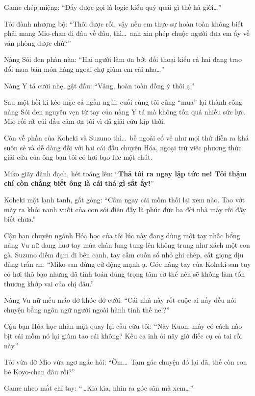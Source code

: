 \documentclass[../main.tex]{subfiles}
\begin{document}
Game chép miệng: ``Đấy được gọi là logic kiểu quỷ quái gì thế hả giời\dots''

Tôi đành nhượng bộ: ``Thôi được rồi, vậy nếu em thực sự hoàn toàn không biết phải mang Mio-chan đi đâu về đâu, thì\dots\ anh xin phép chuộc người đưa em ấy về văn phòng được chứ?''

Nàng Sói đen phàn nàn: ``Hai người làm ơn bớt đối thoại kiểu cả hai đang trao đổi mua bán món hàng ngoài chợ giùm em cái nha\dots''

Nàng Y tá cười nhẹ, gật đầu: ``Vâng, hoàn toàn đồng ý thôi ạ.''

Sau một hồi kì kèo mặc cả ngắn ngủi, cuối cùng tôi cũng ``mua'' lại thành công nàng Sói đen nguyên vẹn từ tay của nàng Y tá mà không tốn quá nhiều sức lực. Mio rối rít cúi đầu cảm ơn tôi vì đã giải cứu kịp thời.

\ct

Còn về phần của Koheki và Suzuno thì\dots\ bề ngoài có vẻ như mọi thứ diễn ra khá suôn sẻ và dễ dàng đối với hai cái đầu chuyên Hóa, ngoại trừ việc phương thức giải cứu của ông bạn tôi có hơi bạo lực một chút.

Miko giãy đành đạch, hét toáng lên: ``\textbf{Thả tôi ra ngay lập tức ne! Tôi thậm chí còn chẳng biết ông là cái thá gì sất ấy!}''

Koheki mặt lạnh tanh, gắt gỏng: ``Câm ngay cái mồm thối lại xem nào. Tao vớt mày ra khỏi nanh vuốt của con sói điên đấy là phúc đức ba đời nhà mày rồi đấy biết chưa.''

Cậu bạn chuyên ngành Hóa học của tôi lúc này đang dùng một tay nhấc bổng nàng Vu nữ đang huơ tay múa chân lung tung lên không trung như xách một con gà. Suzuno điềm đạm đi bên cạnh, tay cầm cuốn sổ nhỏ ghi chép, cất giọng dịu dàng trấn an: ``Miko-san đừng cử động mạnh ạ. Góc nâng tay của Koheki-san tuy có hơi thô bạo nhưng đã tính toán đúng trọng tâm cơ thể nên sẽ không làm tổn thương khớp vai của chị đâu.''

Nàng Vu nữ mếu máo dở khóc dở cười: ``Cái nhà này rốt cuộc ai nấy đều nói chuyện bằng ngôn ngữ người ngoài hành tinh thế ne!?''

Cậu bạn Hóa học nhăn mặt quay lại cầu cứu tôi: ``Này Kuon, mày có cách nào bịt cái mồm nó lại giùm tao cái không? Kêu ca inh ỏi nãy giờ điếc cụ cả tai rồi này.''

Tôi vừa đỡ Mio vừa ngơ ngác hỏi: ``Ờm\dots\ Tạm gác chuyện đó lại đã, thế còn con bé Koyo-chan đâu rồi?''

Game nheo mắt chỉ tay: ``\dots Kia kìa, nhìn ra góc sân mà xem\dots''
\end{document}
